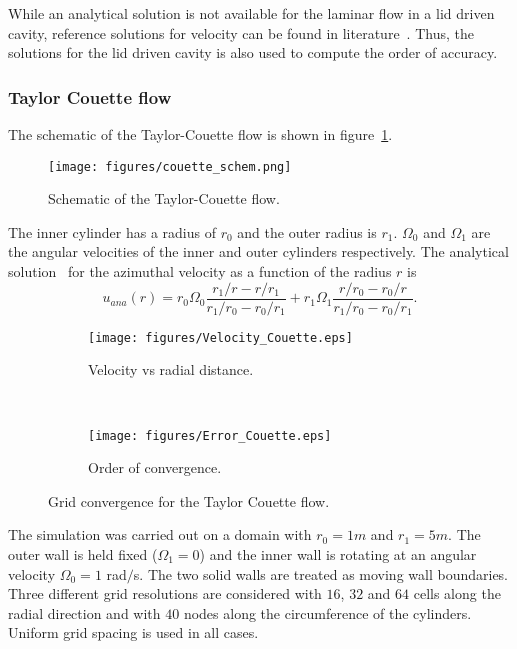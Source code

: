While an analytical solution is not available for the laminar flow in a lid driven cavity, reference solutions for velocity can be found in literature~\cite{Ghia1982}. Thus, the solutions for the lid driven cavity is also used to compute the order of accuracy.

\subsubsection{Taylor Couette flow}
The schematic of the Taylor-Couette flow is shown in figure~\ref{fig:couetteschem}. 
\begin{figure}[h]
    \centering
    \captionsetup{justification=centering}
    \texttt{[image: figures/couette\_schem.png]}
    \caption{Schematic of the Taylor-Couette flow.}
     \label{fig:couetteschem}
\end{figure}
The inner cylinder has a radius of $r_0$ and the outer radius is $r_1$. $\Omega_0$ and $\Omega_1$ are the angular velocities of the inner and outer cylinders respectively. The analytical solution~\cite{taylor1923viii} for the azimuthal velocity as a function of the radius $r$ is
\begin{equation}
    u_{ana}(r) = r_0 \Omega_0 \frac{r_1/r - r/r_1}{r_1/r_0-r_0/r_1} + r_1 \Omega_1 \frac{r/r_0 - r_0/r}{r_1/r_0-r_0/r_1}.
\end{equation}{}
\begin{figure}[h]
    \centering
     \captionsetup{justification=centering}
    \begin{subfigure}[b]{0.47\textwidth}
    \captionsetup{justification=centering}
        \texttt{[image: figures/Velocity\_Couette.eps]}
        \caption{Velocity vs radial distance.}
        \label{fig:couettevel}
    \end{subfigure}
    ~ %
    \begin{subfigure}[b]{0.47\textwidth}
    \centering
    \captionsetup{justification=centering}
        \texttt{[image: figures/Error\_Couette.eps]}
        \caption{Order of convergence.}
        \label{fig:couetteerr}
    \end{subfigure}
    \caption{Grid convergence for the Taylor Couette flow.}
\end{figure}

The simulation was carried out on a domain with $r_0 = 1m$ and $r_1=5m$. The outer wall is held fixed ($\Omega_1 = 0$) and the inner wall is rotating at an angular velocity $\Omega_0 = 1$ rad$/$s. The two solid walls are treated as moving wall boundaries. Three different grid resolutions are considered with $16$, $32$ and $64$ cells along the radial direction and with $40$ nodes along the circumference of the cylinders. Uniform grid spacing is used in all cases. 

